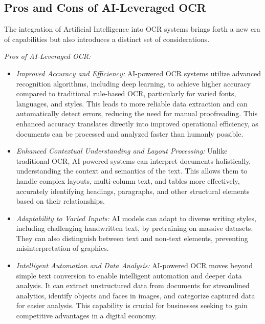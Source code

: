 \subsection{Pros and Cons of AI-Leveraged OCR}

The integration of Artificial Intelligence into OCR systems brings forth a new era of capabilities but also introduces a distinct set of considerations.

\emph{Pros of AI-Leveraged OCR:}
\begin{itemize}
    \item \emph{Improved Accuracy and Efficiency:} AI-powered OCR systems utilize advanced recognition algorithms, including deep learning, to achieve higher accuracy compared to traditional rule-based OCR, particularly for varied fonts, languages, and styles. \cite{AddeptoAIOCR} This leads to more reliable data extraction and can automatically detect errors, reducing the need for manual proofreading. \cite{AddeptoAIOCR} This enhanced accuracy translates directly into improved operational efficiency, as documents can be processed and analyzed faster than humanly possible. \cite{AddeptoAIOCR}
    \item \emph{Enhanced Contextual Understanding and Layout Processing:} Unlike traditional OCR, AI-powered systems can interpret documents holistically, understanding the context and semantics of the text. \cite{BeyondKeyAIOCR, AddeptoAIOCR} This allows them to handle complex layouts, multi-column text, and tables more effectively, accurately identifying headings, paragraphs, and other structural elements based on their relationships. \cite{BeyondKeyAIOCR, AddeptoAIOCR}
    \item \emph{Adaptability to Varied Inputs:} AI models can adapt to diverse writing styles, including challenging handwritten text, by pretraining on massive datasets. \cite{BeyondKeyAIOCR} They can also distinguish between text and non-text elements, preventing misinterpretation of graphics. \cite{MediumLayoutLMv3}
    \item \emph{Intelligent Automation and Data Analysis:} AI-powered OCR moves beyond simple text conversion to enable intelligent automation and deeper data analysis. It can extract unstructured data from documents for streamlined analytics, identify objects and faces in images, and categorize captured data for easier analysis. \cite{AddeptoAIOCR} This capability is crucial for businesses seeking to gain competitive advantages in a digital economy. \cite{AddeptoAIOCR}
\end{itemize}

